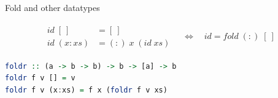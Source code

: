 \documentclass[lualatex]{beamer}
\renewcommand{\_}{\textscale{.6}{\textunderscore}}
\begin{document}

\begin{frame}[fragile]{Fold and other datatypes}

\begin{align*}
\begin{split}
id\;[\:] & = [\:] \\
id\;(x:xs) & = (:)\;x\;(id\;xs)
\end{split}\quad
\Longleftrightarrow\quad
id = fold\;(:)\;[\:]
\end{align*}
\pause

\begin{lstlisting}[language=Haskell, morekeywords={foldr}]
foldr :: (a -> b -> b) -> b -> [a] -> b
foldr f v [] = v
foldr f v (x:xs) = f x (foldr f v xs)
\end{lstlisting}

\end{frame}
\end{document}
